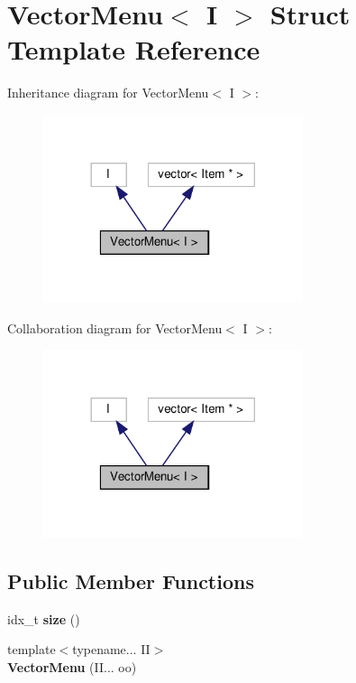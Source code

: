 \hypertarget{structVectorMenu}{}\section{Vector\+Menu$<$ I $>$ Struct Template Reference}
\label{structVectorMenu}


Inheritance diagram for Vector\+Menu$<$ I $>$\+:\nopagebreak
\begin{figure}[H]
\begin{center}
\leavevmode
\includegraphics[width=216pt]{structVectorMenu__inherit__graph}
\end{center}
\end{figure}


Collaboration diagram for Vector\+Menu$<$ I $>$\+:\nopagebreak
\begin{figure}[H]
\begin{center}
\leavevmode
\includegraphics[width=216pt]{structVectorMenu__coll__graph}
\end{center}
\end{figure}
\subsection*{Public Member Functions}
\begin{DoxyCompactItemize}
\item 
\mbox{\label{structVectorMenu_af1df124456c3945b288f7915c6bcfd92}} 
idx\+\_\+t {\bfseries size} ()
\item 
\mbox{\label{structVectorMenu_a0455d0a8f0a5cc620c9d0c70c3ed4cf2}} 
{\footnotesize template$<$typename... II$>$ }\\{\bfseries Vector\+Menu} (I\+I... oo)
\end{DoxyCompactItemize}
